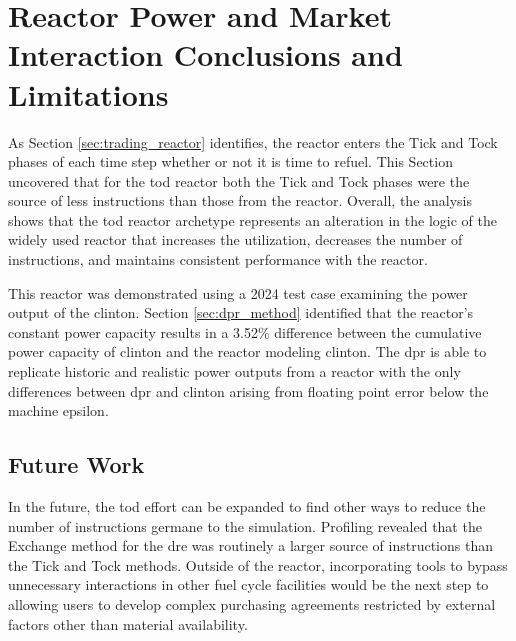 \section{Reactor Power and Market Interaction Conclusions and Limitations}

As Section \ref{sec:trading_reactor} identifies, the \cycamore reactor enters the Tick and Tock phases of each time step whether or not it is time to refuel. This Section uncovered that for the \gls{tod} reactor both the Tick and Tock phases were the source of less instructions than those from the \cycamore reactor. Overall, the analysis shows that the \gls{tod} reactor archetype represents an alteration in the logic of the widely used \cycamore reactor that increases the utilization, decreases the number of instructions, and maintains consistent performance with the \cycamore reactor.

This reactor was demonstrated using a 2024 test case examining the power output of the \gls{clinton}. Section \ref{sec:dpr_method} identified that the \cycamore reactor's constant power capacity results in a 3.52\% difference between the cumulative power capacity of \gls{clinton} and the \cycamore reactor modeling \gls{clinton}. The \gls{dpr} is able to replicate historic and realistic power outputs from a reactor with the only differences between \gls{dpr} and \gls{clinton} arising from floating point error below the machine epsilon.

\subsection{Future Work}
\label{sec:time_future_work}

In the future, the \gls{tod} effort can be expanded to find other ways to reduce the number of instructions germane to the simulation. Profiling revealed that the Exchange method for the \gls{dre} was routinely a larger source of instructions than the Tick and Tock methods. Outside of the reactor, incorporating tools to bypass unnecessary interactions in other fuel cycle facilities would be the next step to allowing users to develop complex purchasing agreements restricted by external factors other than material availability.

